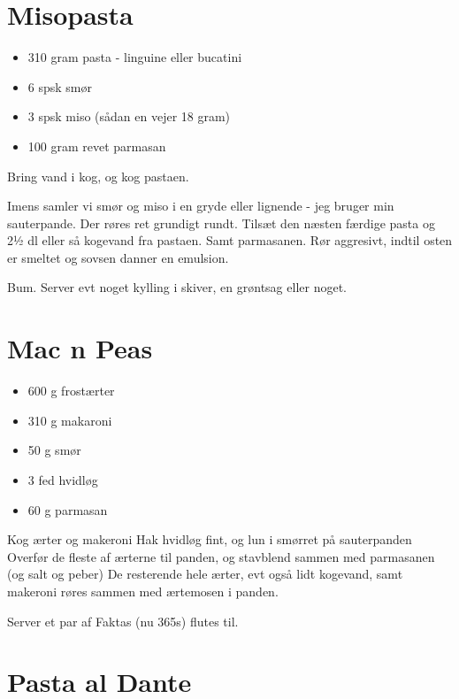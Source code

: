 \documentclass[
]{book}
\providecommand{\tightlist}{%
  \setlength{\itemsep}{0pt}\setlength{\parskip}{0pt}}
\begin{document}
\hypertarget{misopasta}{%
\section{Misopasta}\label{misopasta}}

\begin{itemize}
\tightlist
\item
  310 gram pasta - linguine eller bucatini
\item
  6 spsk smør
\item
  3 spsk miso (sådan en vejer 18 gram)
\item
  100 gram revet parmasan
\end{itemize}

Bring vand i kog, og kog pastaen.

Imens samler vi smør og miso i en gryde eller lignende - jeg
bruger min sauterpande. Der røres ret grundigt rundt.
Tilsæt den næsten færdige pasta og 2½ dl eller så kogevand
fra pastaen. Samt parmasanen. Rør aggresivt, indtil
osten er smeltet og sovsen danner en emulsion.

Bum. Server evt noget kylling i skiver, en grøntsag eller noget.

\hypertarget{mac-n-peas}{%
\section{Mac n Peas}\label{mac-n-peas}}

\begin{itemize}
\tightlist
\item
  600 g frostærter
\item
  310 g makaroni
\item
  50 g smør
\item
  3 fed hvidløg
\item
  60 g parmasan
\end{itemize}

Kog ærter og makeroni
Hak hvidløg fint, og lun i smørret på sauterpanden
Overfør de fleste af ærterne til panden, og stavblend sammen med parmasanen (og salt og peber)
De resterende hele ærter, evt også lidt kogevand, samt makeroni røres sammen med ærtemosen i panden.

Server et par af Faktas (nu 365s) flutes til.

\hypertarget{pasta-al-dante}{%
\section{Pasta al Dante}\label{pasta-al-dante}}
\end{document}
